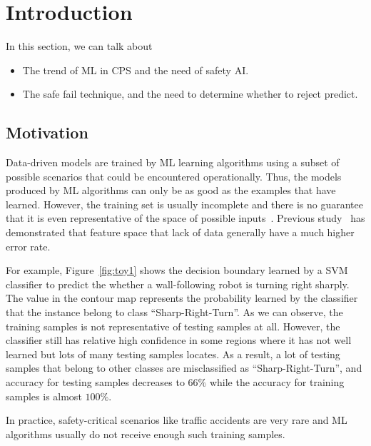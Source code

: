 \section{Introduction}
In this section, we can talk about 
\begin{itemize}
    \item The trend of ML  in CPS and the need of safety AI.
    \item The safe fail technique, and the need to determine whether to reject predict.
\end{itemize}






\subsection{Motivation}
Data-driven  models are trained by ML learning algorithms using a subset of possible scenarios that could be encountered operationally.   Thus,  the models produced by ML algorithms  can only be as good as the examples that have learned.  However, the training set is usually incomplete and there is no guarantee that it is even representative of the space of possible inputs~\cite{ISO16}.  Previous study~\cite{weiss1995learning} has demonstrated that  feature space that lack of data generally have a much higher error rate.    
\begin{example}
    For example, Figure~\ref{fig:toy1} shows the decision boundary learned by a SVM classifier to predict the whether a wall-following  robot is turning right sharply.  The value in the contour map represents the probability learned by the classifier that the instance belong to class ``Sharp-Right-Turn''.  As we can observe, the training samples is not  representative of testing samples at all. However, the classifier still has relative high confidence in some regions where it has not well learned but lots of many testing samples locates. As a result, a lot of testing samples that belong to other classes are misclassified as ``Sharp-Right-Turn'', and accuracy for testing samples decreases to $66\%$ while the accuracy for training samples is almost $100\%$.
    \label{example:toy1}
\end{example}
In practice, safety-critical scenarios like traffic accidents are very rare and ML algorithms usually do not receive enough such training samples.



